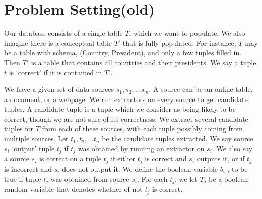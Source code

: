 \documentclass{sig-alternate}
\newcounter{prob}
\begin{document}





\section{Problem Setting(old)}
Our database consists of a single table $T$, which we want to populate. We also imagine there is a conceptual table $T'$ that is fully populated. For instance, $T$ may be a table with schema, (Country, President), and only a few tuples filled in. Then $T'$ is a table that contains all countries and their presidents. We say a tuple $t$ is `correct' if it is contained in $T'$. 

We have a given set of data sources $s_1, s_2, ... s_m$. A source can be an online table, a document, or a webpage. We run extractors on every source to get candidate tuples. A candidate tuple is a tuple which we consider as being likely to be correct, though we are not sure of its correctness. We extract several candidate tuples for $T$ from each of these sources, with each tuple possibly coming from multiple sources. Let $t_1, t_2, ... t_n$ be the candidate tuples extracted. We say source $s_i$ `output' tuple $t_j$ if $t_j$ was obtained by running an extractor on $s_i$. We also say a source $s_i$ is correct on a tuple $t_j$ if either $t_j$ is correct and $s_i$ outputs it, or if $t_j$ is incorrect and $s_i$ does not output it. We define the boolean variable $b_{i,j}$ to be true if tuple $t_j$ was obtained from source $s_i$. For each $t_j$, we let $T_j$ be a boolean random variable that denotes whether of not $t_j$ is correct. 
\end{document}
